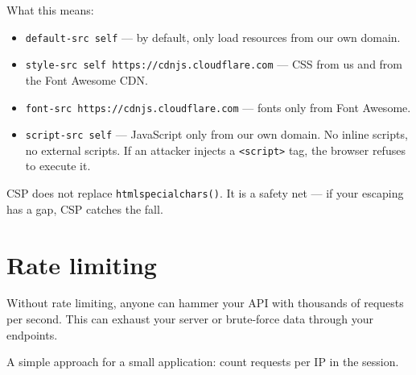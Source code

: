 \documentclass[11pt,a4paper,oneside]{book}
\providecommand{\tightlist}{%
  \setlength{\itemsep}{0pt}\setlength{\parskip}{0pt}}
\begin{document}
What this means:

\begin{itemize}
\tightlist
\item
  \texttt{default-src\ \textquotesingle{}self\textquotesingle{}}
  --- by default, only load resources from our own domain.
\item
  \texttt{style-src\ \textquotesingle{}self\textquotesingle{}\ https://cdnjs.cloudflare.com}
  --- CSS from us and from the Font Awesome CDN.
\item
  \texttt{font-src\ https://cdnjs.cloudflare.com} --- fonts only
  from Font Awesome.
\item
  \texttt{script-src\ \textquotesingle{}self\textquotesingle{}}
  --- JavaScript only from our own domain. No inline scripts, no
  external scripts. If an attacker injects a
  \texttt{\textless{}script\textgreater{}} tag, the browser
  refuses to execute it.
\end{itemize}

CSP does not replace \texttt{htmlspecialchars()}. It is a safety
net --- if your escaping has a gap, CSP catches the fall.

\hypertarget{rate-limiting}{%
\section{Rate limiting}\label{rate-limiting}}

Without rate limiting, anyone can hammer your API with thousands
of requests per second. This can exhaust your server or
brute-force data through your endpoints.

A simple approach for a small application: count requests per IP
in the session.
\end{document}
